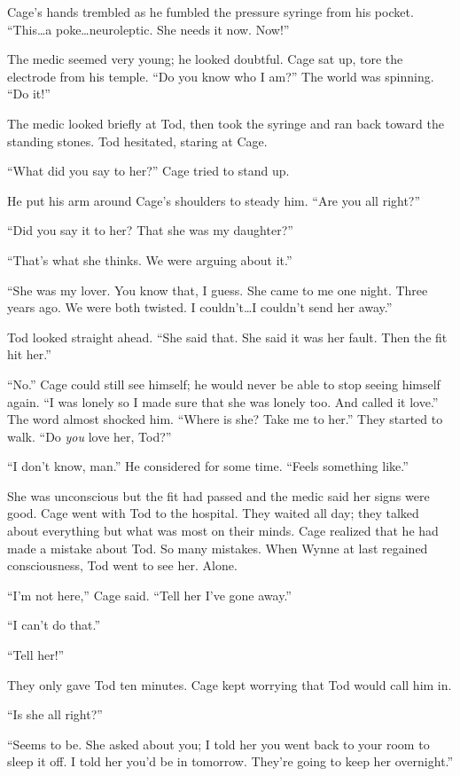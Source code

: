 Cage's hands trembled as he fumbled the pressure syringe from his pocket. ``This\ldots a poke\ldots neuroleptic. She needs it now. Now!''

The medic seemed very young; he looked doubtful. Cage sat up, tore the electrode from his temple. ``Do you know who I am?'' The world was spinning. ``Do it!''

The medic looked briefly at Tod, then took the syringe and ran back toward the standing stones. Tod hesitated, staring at Cage.

``What did you say to her?'' Cage tried to stand up.

He put his arm around Cage's shoulders to steady him. ``Are you all right?''

``Did you say it to her? That she was my daughter?''

``That's what she thinks. We were arguing about it.''

``She was my lover. You know that, I guess. She came to me one night. Three years ago. We were both twisted. I couldn't\ldots I couldn't send her away.''

Tod looked straight ahead. ``She said that. She said it was her fault. Then the fit hit her.''

``No.'' Cage could still see himself; he would never be able to stop seeing himself again. ``I was lonely so I made sure that she was lonely too. And called it love.'' The word almost shocked him. ``Where is she? Take me to her.'' They started to walk. ``Do \textit{you} love her, Tod?''

``I don't know, man.'' He considered for some time. ``Feels something like.''

She was unconscious but the fit had passed and the medic said her signs were good. Cage went with Tod to the hospital. They waited all day; they talked about everything but what was most on their minds. Cage realized that he had made a mistake about Tod. So many mistakes. When Wynne at last regained consciousness, Tod went to see her. Alone.

``I'm not here,'' Cage said. ``Tell her I've gone away.''

``I can't do that.''

``Tell her!''

They only gave Tod ten minutes. Cage kept worrying that Tod would call him in.

``Is she all right?''

``Seems to be. She asked about you; I told her you went back to your room to sleep it off. I told her you'd be in tomorrow. They're going to keep her overnight.''

